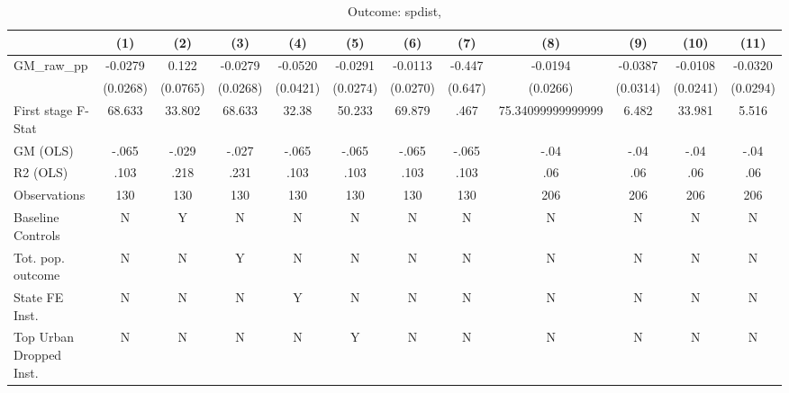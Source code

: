\begin{table}[htbp]\centering
\def\sym#1{\ifmmode^{#1}\else\(^{#1}\)\fi}
\caption{Outcome: spdist, }
\begin{tabular}{l*{11}{c}}
\toprule
            &\multicolumn{1}{c}{(1)}   &\multicolumn{1}{c}{(2)}   &\multicolumn{1}{c}{(3)}   &\multicolumn{1}{c}{(4)}   &\multicolumn{1}{c}{(5)}   &\multicolumn{1}{c}{(6)}   &\multicolumn{1}{c}{(7)}   &\multicolumn{1}{c}{(8)}   &\multicolumn{1}{c}{(9)}   &\multicolumn{1}{c}{(10)}   &\multicolumn{1}{c}{(11)}   \\
\midrule
GM\_raw\_pp   &  -0.0279   &    0.122   &  -0.0279   &  -0.0520   &  -0.0291   &  -0.0113   &   -0.447   &  -0.0194   &  -0.0387   &  -0.0108   &  -0.0320   \\
            & (0.0268)   & (0.0765)   & (0.0268)   & (0.0421)   & (0.0274)   & (0.0270)   &  (0.647)   & (0.0266)   & (0.0314)   & (0.0241)   & (0.0294)   \\
\midrule
First stage F-Stat&   68.633   &   33.802   &   68.633   &    32.38   &   50.233   &   69.879   &     .467   &75.34099999999999   &    6.482   &   33.981   &    5.516   \\
GM (OLS)    &    -.065   &    -.029   &    -.027   &    -.065   &    -.065   &    -.065   &    -.065   &     -.04   &     -.04   &     -.04   &     -.04   \\
R2 (OLS)    &     .103   &     .218   &     .231   &     .103   &     .103   &     .103   &     .103   &      .06   &      .06   &      .06   &      .06   \\
Observations&      130   &      130   &      130   &      130   &      130   &      130   &      130   &      206   &      206   &      206   &      206   \\
Baseline Controls&        N   &        Y   &        N   &        N   &        N   &        N   &        N   &        N   &        N   &        N   &        N   \\
Tot. pop. outcome&        N   &        N   &        Y   &        N   &        N   &        N   &        N   &        N   &        N   &        N   &        N   \\
State FE Inst.&        N   &        N   &        N   &        Y   &        N   &        N   &        N   &        N   &        N   &        N   &        N   \\
Top Urban Dropped Inst.&        N   &        N   &        N   &        N   &        Y   &        N   &        N   &        N   &        N   &        N   &        N   \\

\end{tabular}
\end{table}
